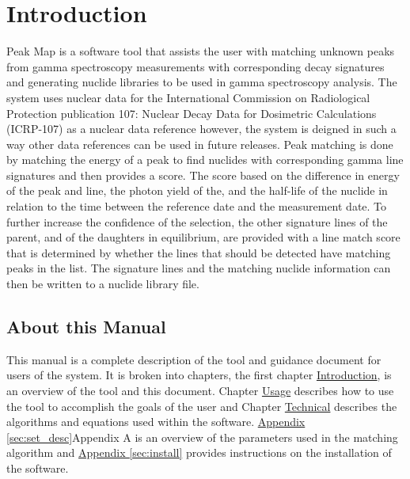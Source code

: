 \documentclass[12pt,report,justified]{SANDreport}
\begin{document}
    \chapter{Introduction}\label{sec:intro}
Peak Map is a software tool that assists the user with matching unknown peaks from gamma
spectroscopy measurements with corresponding decay signatures and generating nuclide libraries
to be used in gamma spectroscopy analysis. The system uses nuclear data for the International
Commission on Radiological Protection publication 107: Nuclear Decay Data for Dosimetric
Calculations (ICRP-107) as a nuclear data reference however, the system is deigned in such a way
other data references can be used in future releases. Peak matching is done by matching the energy
of a peak to find nuclides with corresponding gamma line signatures and then provides a score.
The score based on the difference in energy of the peak and line, the photon yield of the, and the
half-life of the nuclide in relation to the time between the reference date and the measurement date.
To further increase the confidence of the selection, the other signature lines of the parent, and of the
daughters in equilibrium, are provided with a line match score that is determined by whether the
lines that should be detected have matching peaks in the list. The signature lines and the matching
nuclide information can then be written to a nuclide library file.

\section{About this Manual}\label{sec:about}
This manual is a complete description of the tool and guidance document for users of the system. It
is broken into chapters, the first chapter \hyperref[sec:intro]{Introduction}, is an overview of the tool and this document.
Chapter \hyperref[sec:usage]{Usage} describes how to use the tool to accomplish the goals of the user and Chapter
\hyperref[sec:tech]{Technical} describes the algorithms and equations used within the software. \hyperref[sec:set_desc]{Appendix \ref{sec:set_desc}}Appendix A is an
overview of the parameters used in the matching algorithm and \hyperref[sec:install]{Appendix \ref{sec:install}} provides instructions
on the installation of the software.
\end{document}
